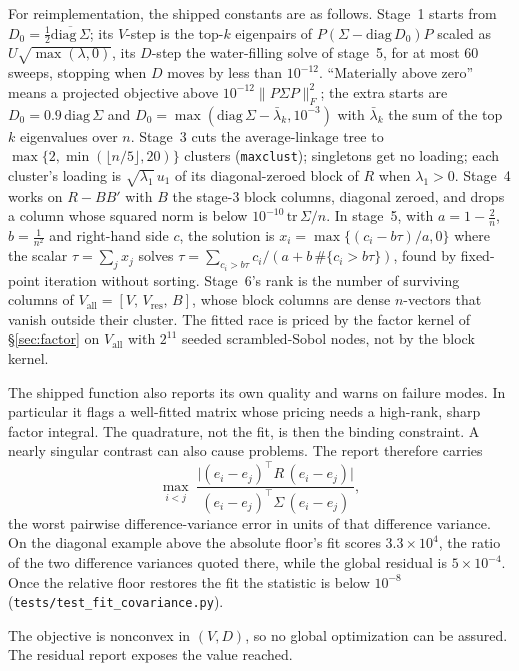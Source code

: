 \documentclass[11pt]{article}
\begin{document}
For reimplementation, the shipped constants are as follows. Stage~1
starts from $D_0=\tfrac12\overline{\mathrm{diag}\,\Sigma}$; its $V$-step
is the top-$k$ eigenpairs of $P(\Sigma-\mathrm{diag}\,D_0)P$ scaled as
$U\sqrt{\max(\lambda,0)}$, its $D$-step the water-filling solve of
stage~5, for at most $60$ sweeps, stopping when $D$ moves by less than
$10^{-12}$. ``Materially above zero'' means a projected objective above
$10^{-12}\lVert P\Sigma P\rVert_F^2$; the extra starts are
$D_0=0.9\,\mathrm{diag}\,\Sigma$ and
$D_0=\max(\mathrm{diag}\,\Sigma-\bar\lambda_k,10^{-3})$ with
$\bar\lambda_k$ the sum of the top $k$ eigenvalues over $n$. Stage~3
cuts the average-linkage tree to $\max\{2,\min(\lfloor n/5\rfloor,20)\}$
clusters (\texttt{maxclust}); singletons get no loading; each cluster's
loading is $\sqrt{\lambda_1}\,u_1$ of its diagonal-zeroed block of $R$
when $\lambda_1>0$. Stage~4 works on $R-BB'$ with $B$ the stage-3 block
columns, diagonal zeroed, and drops a column whose squared norm is below
$10^{-10}\,\mathrm{tr}\,\Sigma/n$. In stage~5, with $a=1-\tfrac2n$,
$b=\tfrac1{n^2}$ and right-hand side $c$, the solution is
$x_i=\max\{(c_i-b\tau)/a,0\}$ where the scalar $\tau=\sum_jx_j$
solves $\tau=\sum_{c_i>b\tau}c_i/(a+b\,\#\{c_i>b\tau\})$, found by
fixed-point iteration without sorting. Stage~6's rank is the number of
surviving columns of $V_{\mathrm{all}}=[V,\,V_{\mathrm{res}},\,B]$, whose
block columns are dense $n$-vectors that vanish outside their cluster. The
fitted race is priced by the factor kernel of \S\ref{sec:factor} on
$V_{\mathrm{all}}$ with $2^{11}$ seeded scrambled-Sobol nodes, not by the
block kernel.

The shipped function also
reports its own quality and warns on failure modes. In particular it
flags a well-fitted matrix whose pricing needs a high-rank, sharp factor
integral. The quadrature, not the fit, is then the binding constraint. A nearly
singular
contrast can also cause problems. The report therefore carries
\[
\max_{i<j}\;
\frac{\bigl|(e_i-e_j)^{\top}R\,(e_i-e_j)\bigr|}
     {(e_i-e_j)^{\top}\Sigma\,(e_i-e_j)} ,
\]
the worst pairwise difference-variance error in units of that
difference variance. On the diagonal example above the absolute floor's
fit scores $3.3\times10^{4}$, the ratio of the two difference variances
quoted there, while the global residual is $5\times10^{-4}$. Once the
relative floor restores the fit the statistic is below $10^{-8}$
(\texttt{tests/test\_fit\_covariance.py}).

The objective is nonconvex in $(V,D)$, so
no global optimization can be assured. The residual report exposes the
value reached.
\end{document}
